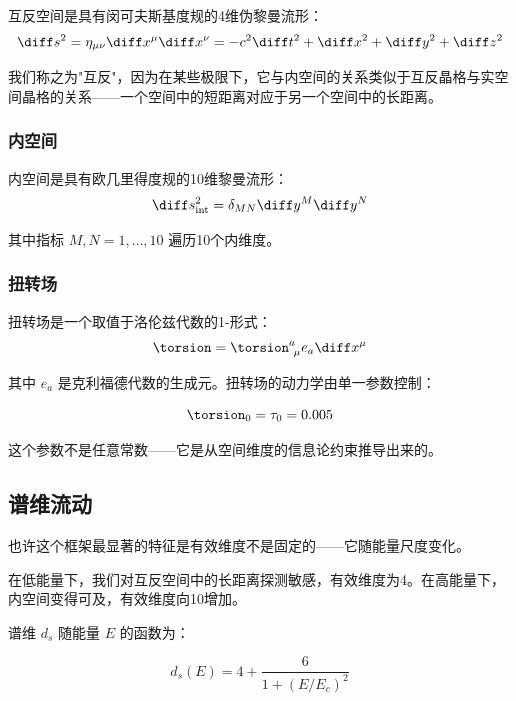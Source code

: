 互反空间是具有闵可夫斯基度规的4维伪黎曼流形：
\begin{equation}
\diff s^2 = \eta_{\mu\nu} \diff x^\mu \diff x^\nu = -c^2\diff t^2 + \diff x^2 + \diff y^2 + \diff z^2
\end{equation}

我们称之为"互反"，因为在某些极限下，它与内空间的关系类似于互反晶格与实空间晶格的关系——一个空间中的短距离对应于另一个空间中的长距离。

\subsubsection{内空间}

内空间是具有欧几里得度规的10维黎曼流形：
\begin{equation}
\diff s_{\text{int}}^2 = \delta_{MN} \diff y^M \diff y^N
\end{equation}

其中指标 $M, N = 1, \ldots, 10$ 遍历10个内维度。

\subsubsection{扭转场}

扭转场是一个取值于洛伦兹代数的1-形式：
\begin{equation}
\torsion = \torsion^a_{\ \mu} e_a \diff x^\mu
\end{equation}

其中 $e_a$ 是克利福德代数的生成元。扭转场的动力学由单一参数控制：

\begin{equation}
\torsion_0 = \tau_0 = 0.005
\end{equation}

这个参数不是任意常数——它是从空间维度的信息论约束推导出来的。

\subsection{谱维流动}

也许这个框架最显著的特征是有效维度不是固定的——它随能量尺度变化。

在低能量下，我们对互反空间中的长距离探测敏感，有效维度为4。在高能量下，内空间变得可及，有效维度向10增加。

谱维 $d_s$ 随能量 $E$ 的函数为：

\begin{equation}
\boxed{d_s(E) = 4 + \frac{6}{1 + (E/E_c)^2}}
\end{equation}

